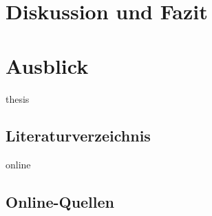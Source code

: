 \documentclass[11pt,a4paper]{report}
\begin{document}
\chapter{Diskussion und Fazit} \label{chap:fazit}
\chapter{Ausblick} \label{chap:fazit}


\begin{btSect}{thesis} %
\section*{Literaturverzeichnis}
\btPrintCited
\end{btSect}
\begin{btSect}{online}
\section*{Online-Quellen}
\btPrintCited
\end{btSect}
\end{document}
